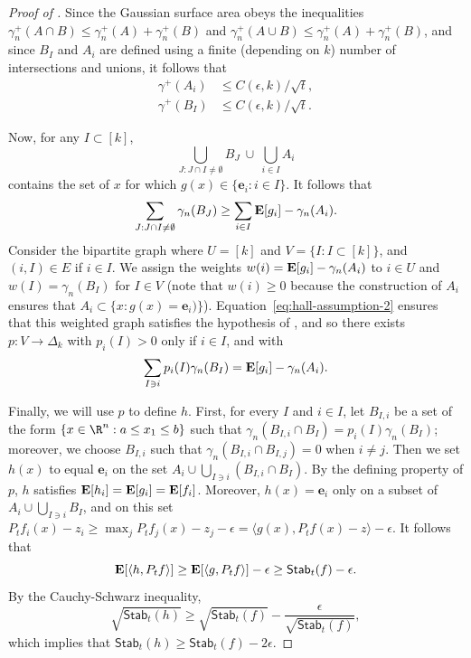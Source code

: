 \documentclass{toc}
\newcommand{\E}{{\bf E}}
\newcommand{\Stab}{\mathsf{Stab}}
\begin{document}
\begin{proof}[Proof of ]
Since the Gaussian surface area obeys the inequalities $\gamma_n^+(A \cap B) \le \gamma_n^+(A) + \gamma_n^+(B)$
and $\gamma_n^+(A \cup B) \le \gamma_n^+(A) + \gamma_n^+(B)$, and since $B_I$ and $A_i$ are defined
using a finite (depending on $k$) number of intersections and unions, it follows that
\begin{equation}\label{eq:A-B-surface}
  \begin{aligned}
    \gamma^+(A_i) &\le C(\epsilon, k)/\sqrt t, \\
    \gamma^+(B_I) &\le C(\epsilon, k)/\sqrt t.
  \end{aligned}
\end{equation}

Now, for any $I \subset [k]$,
\[
  \bigcup_{J: J \cap I \ne \emptyset} B_J \:\cup\: \bigcup_{i \in I} A_i
\]
contains the set of $x$ for which $g(x) \in \{\mathbf{e}_i: i \in I\}$. It follows that
\begin{equation}\label{eq:hall-assumption-2}
  \sum_{J: J \cap I \ne \emptyset} \gamma_n(B_J)
  \ge \sum_{i \in I} \E [g_i] - \gamma_n(A_i).
\end{equation}
Consider the bipartite graph where $U = [k]$ and $V = \{I: I \subset [k]\}$, and $(i, I) \in E$ if $i \in I$.
We assign the weights $w(i) = \E[g_i] - \gamma_n(A_i)$ to $i \in U$ and $w(I) = \gamma_n(B_I)$ for $I \in V$
(note that $w(i) \ge 0$ because the construction of $A_i$ ensures that $A_i \subset \{x: g(x) = \mathbf{e}_i)\}$).
Equation~\eqref{eq:hall-assumption-2} ensures that this weighted graph satisfies the hypothesis of ,
and so there exists $p: V \to \Delta_k$ with $p_i(I) > 0$ only if $i \in I$, and with
\[
  \sum_{I \ni i} p_i(I) \gamma_n(B_I) = \E[g_i] - \gamma_n(A_i).
\]

Finally, we will use $p$ to define $h$. First, for every $I$ and $i \in I$, let $B_{I,i}$ be a set of the form
$\{x \in \R^n: a \le x_1 \le b\}$ such that $\gamma_n(B_{I,i} \cap B_I) = p_i(I) \gamma_n(B_I)$; moreover, we choose $B_{I,i}$
such that $\gamma_n(B_{I,i} \cap B_{I,j}) = 0$ when $i \ne j$. Then we
set $h(x)$ to equal $\mathbf{e}_i$ on the set $A_i \cup \bigcup_{I \ni i} (B_{I,i} \cap B_I)$. By the defining property of $p$,
$h$ satisfies $\E[h_i] = \E[g_i] = \E[f_i]$. Moreover, $h(x) = \mathbf{e}_i$ only on a subset of $A_i \cup \bigcup_{I \ni i} B_I$,
and on this set $P_t f_i(x) - z_i \ge \max_j P_t f_j(x) - z_j - \epsilon = \langle g(x), P_t f(x) - z\rangle - \epsilon$.
It follows that
\[
  \E[\langle h, P_t f\rangle] \ge \E[\langle g, P_t f\rangle] - \epsilon \ge \Stab_t(f) - \epsilon.
\]
By the Cauchy-Schwarz inequality,
\[
  \sqrt{\Stab_t(h)} \ge \sqrt{\Stab_t(f)} - \frac{\epsilon}{\sqrt{\Stab_t(f)}},
\]
which implies that $\Stab_t(h) \ge \Stab_t(f) - 2\epsilon$.


\end{proof}
\end{document}
